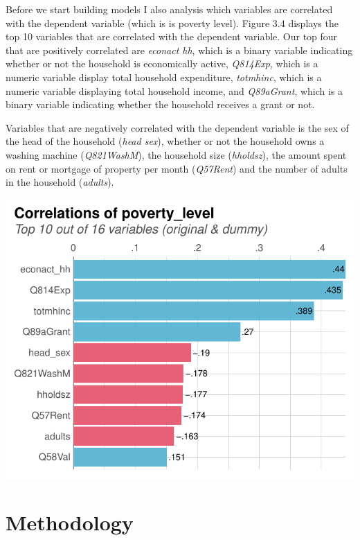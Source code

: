 \documentclass[11pt,preprint, authoryear]{elsarticle}
\let\origfigure\figure
\let\endorigfigure\endfigure
\renewenvironment{figure}[1][2] {
    \expandafter\origfigure\expandafter[H]
} {
    \endorigfigure
}
\numberwithin{equation}{section}
\numberwithin{figure}{section}
\numberwithin{table}{section}
\begin{document}
Before we start building models I also analysis which variables are
correlated with the dependent variable (which is is poverty level).
Figure 3.4 displays the top 10 variables that are correlated with the
dependent variable. Our top four that are positively correlated are
\textit{econact hh}, which is a binary variable indicating whether or
not the household is economically active, \emph{Q814Exp}, which is a
numeric variable display total household expenditure, \emph{totmhinc},
which is a numeric variable displaying total household income, and
\emph{Q89aGrant}, which is a binary variable indicating whether the
household receives a grant or not.

Variables that are negatively correlated with the dependent variable is
the sex of the head of the household (\emph{head sex}), whether or not
the household owns a washing machine (\emph{Q821WashM}), the household
size (\emph{hholdsz}), the amount spent on rent or mortgage of property
per month (\emph{Q57Rent}) and the number of adults in the household
(\emph{adults}).

\begin{figure}[H]

{\centering \includegraphics{Predicting-Poverty_files/figure-latex/Figure4-1} 

}

\caption{Correlation with dependent variable \label{Figure4}}\label{fig:Figure4}
\end{figure}

\hypertarget{methodology}{%
\section{\texorpdfstring{Methodology
\label{Meth}}{Methodology }}\label{methodology}}
\end{document}
